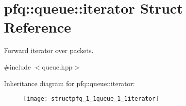 \hypertarget{structpfq_1_1queue_1_1iterator}{\section{pfq\+:\+:queue\+:\+:iterator Struct Reference}
\label{structpfq_1_1queue_1_1iterator}
}


Forward iterator over packets.  




{\ttfamily \#include $<$queue.\+hpp$>$}

Inheritance diagram for pfq\+:\+:queue\+:\+:iterator\+:\begin{figure}[H]
\begin{center}
\leavevmode
\texttt{[image: structpfq\_1\_1queue\_1\_1iterator]}
\end{center}
\end{figure}
